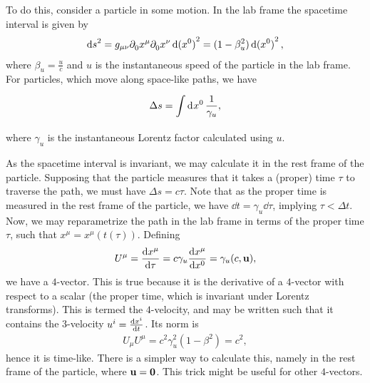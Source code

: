 To do this, consider a particle in some motion. In the lab frame the spacetime interval is given by
\begin{align*}
	\dd{s}^{2} = g_{\mu\nu}\partial^{}_{0}x^{\mu}\partial^{}_{0}x^{\nu}\dd{(x^{0})}^{2} = (1 - \beta_{u}^{2})\dd{(x^{0})}^{2},
\end{align*}
where $\beta_{u} = \frac{u}{c}$ and $u$ is the instantaneous speed of the particle in the lab frame. For particles, which move along space-like paths, we have
\begin{align*}
	\Delta s = \int\limits_{}^{}\dd[]{x^{0}}\frac{1}{\gamma_{u}},
\end{align*}
where $\gamma_{u}$ is the instantaneous Lorentz factor calculated using $u$.

As the spacetime interval is invariant, we may calculate it in the rest frame of the particle. Supposing that the particle measures that it takes a (proper) time $\tau$ to traverse the path, we must have $\Delta s = c\tau$. Note that as the proper time is measured in the rest frame of the particle, we have $\dd{t} = \gamma_{u}\dd{\tau}$, implying $\tau < \Delta t$. Now, we may reparametrize the path in the lab frame in terms of the proper time $\tau$, such that $x^{\mu} = x^{\mu}(t(\tau))$. Defining
\begin{align*}
	U^{\mu} = \dv{x^{\mu}}{\tau} = c\gamma_{u}\dv{x^{\mu}}{x^{0}} = \gamma_{u}(c, \vb{u}),
\end{align*}
we have a $4$-vector. This is true because it is the derivative of a $4$-vector with respect to a scalar (the proper time, which is invariant under Lorentz transforms). This is termed the $4$-velocity, and may be written such that it contains the $3$-velocity $u^{i} = \dv{x^{i}}{t}$. Its norm is
\begin{align*}
	U_{\mu}U^{\mu} = c^{2}\gamma_{u}^{2}(1 - \beta^{2}) = c^{2},
\end{align*}
hence it is time-like. There is a simpler way to calculate this, namely in the rest frame of the particle, where $\vb{u} = \vb{0}$. This trick might be useful for other $4$-vectors.

